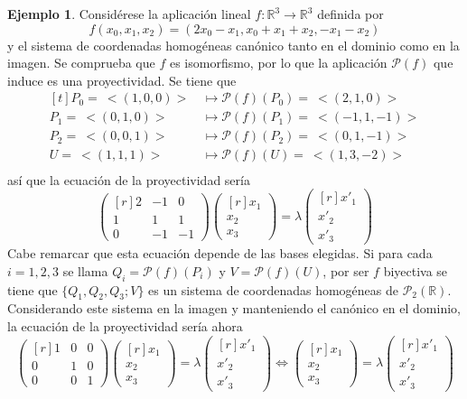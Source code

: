 \documentclass[12pt]{report}
\theoremstyle{definition}
\theoremstyle{definition}
\newtheorem{example}{Ejemplo}[chapter]
\theoremstyle{remark}
\newcommand{\R}{\mathbb R}
\begin{document}
\begin{example}
Considérese la aplicación lineal $f \colon \R^3 \to \R^3$ definida por
\[f(x_0,x_1,x_2) = (2x_0-x_1,x_0+x_1+x_2,-x_1-x_2)\]
y el sistema de coordenadas homogéneas canónico tanto en el dominio como en la imagen. Se comprueba que $f$ es isomorfismo, por lo que la aplicación $\mathcal{P}(f)$ que induce es una proyectividad. Se tiene que
\[
\begin{aligned}[t]
    P_0 = \ <(1,0,0)> \, &\longmapsto \mathcal{P}(f)(P_0) = \ <(2,1,0)> \\
    P_1 = \ <(0,1,0)> \, &\longmapsto \mathcal{P}(f)(P_1) = \ <(-1,1,-1)> \\
    P_2 = \ <(0,0,1)> \, &\longmapsto \mathcal{P}(f)(P_2) = \ <(0,1,-1)> \\
    U = \ <(1,1,1)> \, &\longmapsto \mathcal{P}(f)(U) = \ <(1,3,-2)> \\
\end{aligned}
\]
así que la ecuación de la proyectividad sería
\[\begin{pmatrix*}[r]
    2 & -1 & 0 \\
    1 & 1 &  1 \\
    0 & -1 & -1
\end{pmatrix*} \begin{pmatrix*}[r]
    x_1 \\
    x_2 \\
    x_3
\end{pmatrix*} = \lambda \begin{pmatrix*}[r]
    x'_1 \\
    x'_2 \\
    x'_3
\end{pmatrix*}\]
Cabe remarcar que esta ecuación depende de las bases elegidas. Si para cada $i =1,2,3$ se llama $Q_i = \mathcal{P}(f)(P_i)$ y $V = \mathcal{P}(f)(U)$, por ser $f$ biyectiva se tiene que $\{Q_1,Q_2,Q_3;V\}$ es un sistema de coordenadas homogéneas de $\mathcal{P}_2(\R)$. Considerando este sistema en la imagen y manteniendo el canónico en el dominio, la ecuación de la proyectividad sería ahora
\[\begin{pmatrix*}[r]
    1 & 0 & 0 \\
    0 & 1 & 0 \\
    0 & 0 & 1
\end{pmatrix*} \begin{pmatrix*}[r]
    x_1 \\
    x_2 \\
    x_3
\end{pmatrix*} = \lambda \begin{pmatrix*}[r]
    x'_1 \\
    x'_2 \\
    x'_3
\end{pmatrix*} \iff \begin{pmatrix*}[r]
    x_1 \\
    x_2 \\
    x_3
\end{pmatrix*} = \lambda \begin{pmatrix*}[r]
    x'_1 \\
    x'_2 \\
    x'_3
\end{pmatrix*}\]
\end{example}
\end{document}
